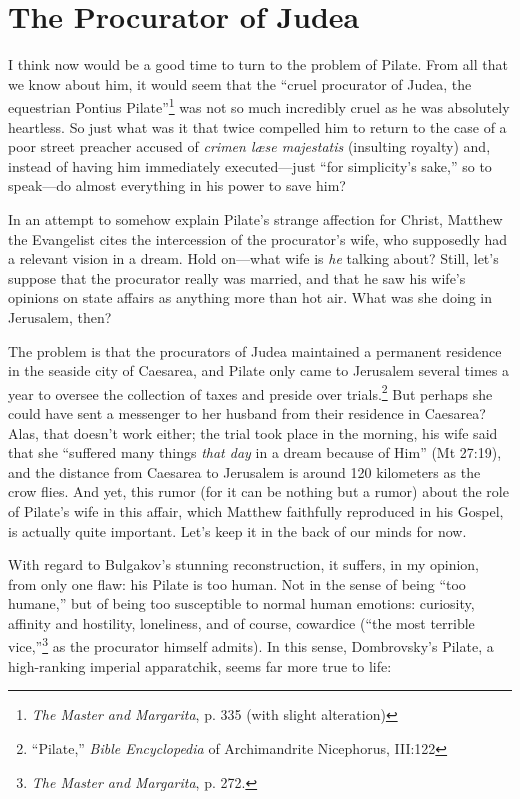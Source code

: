 \chapter*{The Procurator of Judea}

I think now would be a good time to turn to the problem of Pilate. From all that we know about him, it would seem that the ``cruel procurator of Judea, the equestrian Pontius Pilate''\footnote{\emph{The Master and Margarita}, p. 335 (with slight alteration)} was not so much incredibly cruel as he was absolutely heartless. So just what was it that twice compelled him to return to the case of a poor street preacher accused of \emph{crimen læse majestatis} (insulting royalty) and, instead of having him immediately executed---just ``for simplicity's sake,'' so to speak---do almost everything in his power to save him?

In an attempt to somehow explain Pilate's strange affection for Christ, Matthew the Evangelist cites the intercession of the procurator's wife, who supposedly had a relevant vision in a dream. Hold on---what wife is \emph{he} talking about? Still, let's suppose that the procurator really was married, and that he saw his wife's opinions on state affairs as anything more than hot air. What was she doing in Jerusalem, then?

The problem is that the procurators of Judea maintained a permanent residence in the seaside city of Caesarea, and Pilate only came to Jerusalem several times a year to oversee the collection of taxes and preside over trials.\footnote{``Pilate,'' \emph{Bible Encyclopedia} of Archimandrite Nicephorus, III:122} But perhaps she could have sent a messenger to her husband from their residence in Caesarea? Alas, that doesn't work either; the trial took place in the morning, his wife said that she ``suffered many things \emph{that day} in a dream because of Him'' (Mt 27:19), and the distance from Caesarea to Jerusalem is around 120 kilometers as the crow flies. And yet, this rumor (for it can be nothing but a rumor) about the role of Pilate's wife in this affair, which Matthew faithfully reproduced in his Gospel, is actually quite important. Let's keep it in the back of our minds for now.

With regard to Bulgakov's stunning reconstruction, it suffers, in my opinion, from only one flaw: his Pilate is too human. Not in the sense of being ``too humane,'' but of being too susceptible to normal human emotions: curiosity, affinity and hostility, loneliness, and of course, cowardice (``the most terrible vice,''\footnote{\emph{The Master and Margarita}, p. 272.} as the procurator himself admits). In this sense, Dombrovsky's Pilate, a high-ranking imperial apparatchik, seems far more true to life:

